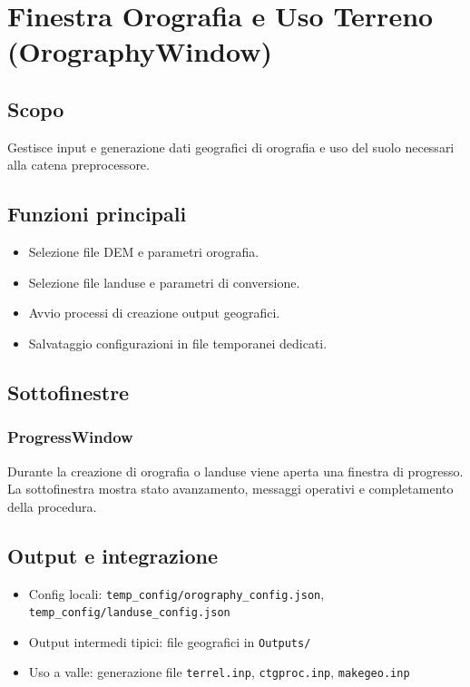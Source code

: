 \chapter{Finestra Orografia e Uso Terreno (OrographyWindow)}

\section{Scopo}
Gestisce input e generazione dati geografici di orografia e uso del suolo necessari alla catena preprocessore.

\section{Funzioni principali}
\begin{itemize}[leftmargin=1.5em]
  \item Selezione file DEM e parametri orografia.
  \item Selezione file landuse e parametri di conversione.
  \item Avvio processi di creazione output geografici.
  \item Salvataggio configurazioni in file temporanei dedicati.
\end{itemize}

\section{Sottofinestre}
\subsection{ProgressWindow}
Durante la creazione di orografia o landuse viene aperta una finestra di progresso.
La sottofinestra mostra stato avanzamento, messaggi operativi e completamento della procedura.

\section{Output e integrazione}
\begin{itemize}[leftmargin=1.5em]
  \item Config locali: \texttt{temp\_config/orography\_config.json}, \texttt{temp\_config/landuse\_config.json}
  \item Output intermedi tipici: file geografici in \texttt{Outputs/}
  \item Uso a valle: generazione file \texttt{terrel.inp}, \texttt{ctgproc.inp}, \texttt{makegeo.inp}
\end{itemize}
